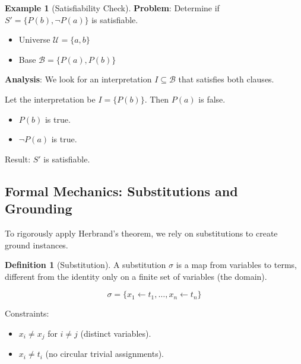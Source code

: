 \documentclass[11pt,a4paper]{article}
\theoremstyle{definition}
\newtheorem{definition}{Definition}[section]
\newtheorem{example}{Example}[section]
\theoremstyle{plain}
\theoremstyle{remark}
\begin{document}
\begin{example}[Satisfiability Check]

\textbf{Problem}: Determine if $S' = \{P(b), \neg P(a)\}$ is satisfiable.

\begin{itemize}

    \item Universe $\mathcal{U} = \{a, b\}$

    \item Base $\mathcal{B} = \{P(a), P(b)\}$

\end{itemize}

\textbf{Analysis}: We look for an interpretation $I \subseteq \mathcal{B}$ that satisfies both clauses.

Let the interpretation be $I = \{P(b)\}$. Then $P(a)$ is false.

\begin{itemize}

    \item $P(b)$ is true.

    \item $\neg P(a)$ is true.

\end{itemize}

Result: $S'$ is satisfiable.

\end{example}



\subsection{Formal Mechanics: Substitutions and Grounding}

To rigorously apply Herbrand's theorem, we rely on substitutions to create ground instances.



\begin{definition}[Substitution]

A substitution $\sigma$ is a map from variables to terms, different from the identity only on a finite set of variables (the domain).

\[ \sigma = \{ x_1 \leftarrow t_1, \dots, x_n \leftarrow t_n \} \]

Constraints:

\begin{itemize}

    \item $x_i \neq x_j$ for $i \neq j$ (distinct variables).

    \item $x_i \neq t_i$ (no circular trivial assignments).

\end{itemize}

\end{definition}
\end{document}
